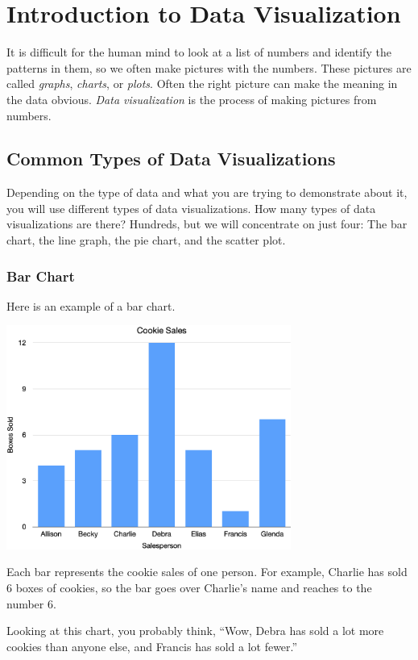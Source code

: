 \chapter{Introduction to Data Visualization}

It is difficult for the human mind to look at a list of numbers and
identify the patterns in them, so we often make pictures with the
numbers. These pictures are called \textit{graphs},
\textit{charts}, or \textit{plots}. Often the right picture can make
the meaning in the data obvious. \textit{Data visualization} is the
process of making pictures from numbers.

\section{Common Types of Data Visualizations}

Depending on the type of data and what you are trying to demonstrate
about it, you will use different types of data visualizations.  How
many types of data visualizations are there? Hundreds, but we will
concentrate on just four: The bar chart, the line graph, the pie
chart, and the scatter plot.

\subsection{Bar Chart}

Here is an example of a bar chart.

\includegraphics[width=0.7\textwidth]{CookieChart.png}

Each bar represents the cookie sales of one person. For example,
Charlie has sold 6 boxes of cookies, so the bar goes over Charlie's
name and reaches to the number 6.

Looking at this chart, you probably think, ``Wow, Debra has sold a lot
more cookies than anyone else, and Francis has sold a lot fewer.''

